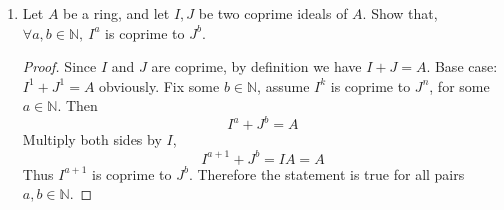 \documentclass[hidelinks,12pt]{article}
\newcommand{\N}{\mathbb{N}}
\newcommand{\Z}{\mathbb{Z}}
\begin{document}
\begin{enumerate}
\begin{proof}
            \[
                k=a+b\cdot \frac{2+i}{5}=a+\frac{2b}{5}+\frac{bi}{5}
            \]
            for some \(a,b\in\Z\). Since \(k=\frac{p}{q}\) is strictly real, we must have
            \[
                \frac{bi}{5}=0\implies b=0
            \]
             But then \(k=a+0\in\Z\) contradiction.\\
            Similarly, write \(k=a+b\cdot \frac{2-i}{5}=a+\frac{2b}{5}-\frac{bi}{5}\) so \(\frac{bi}{5}=0\implies b=0\) so \(k\in\Z\).
        \end{proof}
    \item Let \(A\) be a ring, and let \(I,J\) be two coprime ideals of \(A\). Show that, \(\forall a,b\in\N,\ I^{a}\) is coprime to \(J^{b}\).
        \begin{proof}
            Since \(I\) and \(J\) are coprime, by definition we have \(I+J=A\). Base case: \(I^{1}+J^{1}=A\) obviously. Fix some \(b\in\N\), assume \(I^{k}\) is coprime to \(J^{n}\), for some \(a\in\N\). Then
            \[
                I^{a}+J^{b}=A
            \]
            Multiply both sides by \(I\), \[
            I^{a+1}+J^{b}=IA=A
            \]
            Thus \(I^{a+1}\) is coprime to \(J^{b}\). Therefore the statement is true for all pairs \(a,b\in\N\).
        \end{proof}
\end{enumerate}
\end{document}
